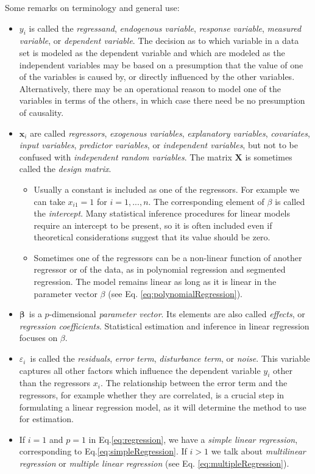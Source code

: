 Some remarks on terminology and general use:
\begin{itemize}     
  \item $y_i$  is called the \emph{regressand}, \emph{endogenous variable}, \emph{response variable}, \emph{measured variable}, or \emph{dependent variable}.  The decision as to which variable in a data set is modeled as the dependent variable and which are modeled as the independent variables may be based on a presumption that the value of one of the variables is caused by, or directly influenced by the other variables. Alternatively, there may be an operational reason to model one of the variables in terms of the others, in which case there need be no presumption of causality.
  \item $\mathbf{x}_i$ are called \emph{regressors}, \emph{exogenous variables}, \emph{explanatory variables}, \emph{covariates}, \emph{input variables}, \emph{predictor variables}, or \emph{independent variables}, but not to be confused with \emph{independent random variables}. The matrix $\mathbf{X}$ is sometimes called the \emph{design matrix}.
      \begin{itemize}
        \item Usually a constant is included as one of the regressors. For example we can take $x_{i1}=1$ for $i=1,...,n$. The corresponding element of $\beta$ is called the \emph{intercept}. Many statistical inference procedures for linear models require an intercept to be present, so it is often included even if theoretical considerations suggest that its value should be zero.
        \item Sometimes one of the regressors can be a non-linear function of another regressor or of the data, as in polynomial regression and segmented regression. The model remains linear as long as it is linear in the parameter vector $\beta$ (see Eq. \ref{eq:polynomialRegression}).
         \end{itemize}
  \item $\boldsymbol\beta\,$ is a $p$-dimensional \emph{parameter vector}. Its elements are also called \emph{effects}, or \emph{regression coefficients}. Statistical estimation and inference in linear regression focuses on $\beta$.
  \item $\varepsilon_i\,$ is called the \emph{residuals}, \emph{error term}, \emph{disturbance term}, or \emph{noise}. This variable captures all other factors which influence the dependent variable $y_i$ other than the regressors $x_i$. The relationship between the error term and the regressors, for example whether they are correlated, is a crucial step in formulating a linear regression model, as it will determine the method to use for estimation.
  \item If $i=1$ and $p=1$ in Eq.\ref{eq:regression}, we have a \emph{simple linear regression}, corresponding to Eq.\ref{eq:simpleRegression}. If $i>1$ we talk about \emph{multilinear regression}  or \emph{multiple linear regression} (see Eq. \ref{eq:multipleRegression}).


\end{itemize}
